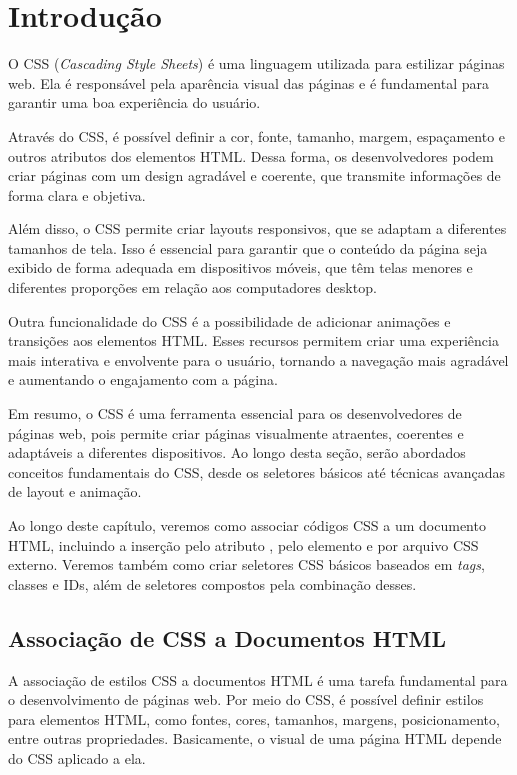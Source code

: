 \chapter{Introdução}

O CSS (\textit{Cascading Style Sheets}) é uma linguagem utilizada para estilizar páginas web. Ela é responsável pela aparência visual das páginas e é fundamental para garantir uma boa experiência do usuário.

Através do CSS, é possível definir a cor, fonte, tamanho, margem, espaçamento e outros atributos dos elementos HTML. Dessa forma, os desenvolvedores podem criar páginas com um design agradável e coerente, que transmite informações de forma clara e objetiva.

Além disso, o CSS permite criar layouts responsivos, que se adaptam a diferentes tamanhos de tela. Isso é essencial para garantir que o conteúdo da página seja exibido de forma adequada em dispositivos móveis, que têm telas menores e diferentes proporções em relação aos computadores desktop.

Outra funcionalidade do CSS é a possibilidade de adicionar animações e transições aos elementos HTML. Esses recursos permitem criar uma experiência mais interativa e envolvente para o usuário, tornando a navegação mais agradável e aumentando o engajamento com a página.

Em resumo, o CSS é uma ferramenta essencial para os desenvolvedores de páginas web, pois permite criar páginas visualmente atraentes, coerentes e adaptáveis a diferentes dispositivos. Ao longo desta seção, serão abordados conceitos fundamentais do CSS, desde os seletores básicos até técnicas avançadas de layout e animação.

Ao longo deste capítulo, veremos como associar códigos CSS a um documento HTML, incluindo a inserção pelo atributo , pelo elemento  e por arquivo CSS externo. Veremos também como criar seletores CSS básicos baseados em \textit{tags}, classes e IDs, além de seletores compostos pela combinação desses.

\section{Associação de CSS a Documentos HTML}

A associação de estilos CSS a documentos HTML é uma tarefa fundamental para o desenvolvimento de páginas web. Por meio do CSS, é possível definir estilos para elementos HTML, como fontes, cores, tamanhos, margens, posicionamento, entre outras propriedades. Basicamente, o visual de uma página HTML depende do CSS aplicado a ela.

